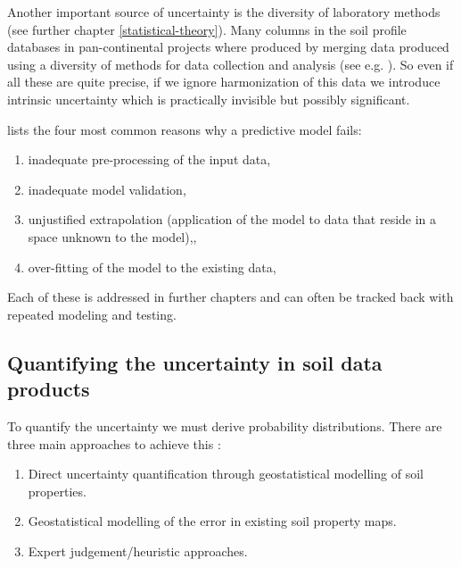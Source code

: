 \documentclass[11pt]{krantz}
\theoremstyle{definition}
\theoremstyle{definition}
\theoremstyle{definition}
\theoremstyle{remark}
\begin{document}
Another important source of uncertainty is the diversity of laboratory
methods (see further chapter \ref{statistical-theory}). Many columns in
the soil profile databases in pan-continental projects where produced by
merging data produced using a diversity of methods for data collection
and analysis (see e.g. \citet{Panagos2013439}). So even if all these are
quite precise, if we ignore harmonization of this data we introduce
intrinsic uncertainty which is practically invisible but possibly
significant.

\citet{kuhn2013applied} lists the four most common reasons why a
predictive model fails:

\begin{enumerate}
\def\labelenumi{\arabic{enumi}.}
\item
  inadequate pre-processing of the input data,
\item
  inadequate model validation,
\item
  unjustified extrapolation (application of the model to data that
  reside in a space unknown to the model),,
\item
  over-fitting of the model to the existing data,
\end{enumerate}

Each of these is addressed in further chapters and can often be tracked
back with repeated modeling and testing.

\hypertarget{quantifying-the-uncertainty-in-soil-data-products}{%
\subsection{Quantifying the uncertainty in soil data
products}\label{quantifying-the-uncertainty-in-soil-data-products}}

To quantify the uncertainty we must derive probability distributions.
There are three main approaches to achieve this
\citep{Brus2011EJSS, Heuvelink2014GSM}:

\begin{enumerate}
\def\labelenumi{\arabic{enumi}.}
\item
  Direct uncertainty quantification through geostatistical modelling of
  soil properties.
\item
  Geostatistical modelling of the error in existing soil property maps.
\item
  Expert judgement/heuristic approaches.
\end{enumerate}
\end{document}
